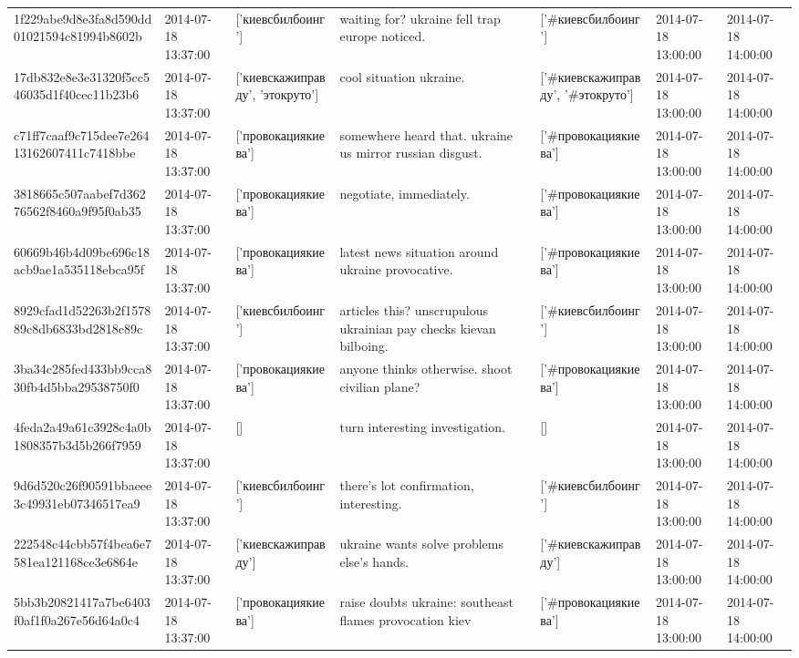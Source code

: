 \begin{tabular}{lllllll}
1f229abe9d8e3fa8d590dd01021594c81994b8602b & 2014-07-18 13:37:00 & ['киевсбилбоинг'] & waiting for? ukraine fell trap europe noticed. & ['#киевсбилбоинг'] & 2014-07-18 13:00:00 & 2014-07-18 14:00:00 \\
17db832e8e3e31320f5cc546035d1f40cec11b23b6 & 2014-07-18 13:37:00 & ['киевскажиправду', 'этокруто'] & cool situation ukraine. & ['#киевскажиправду', '#этокруто'] & 2014-07-18 13:00:00 & 2014-07-18 14:00:00 \\
c71ff7caaf9c715dee7e26413162607411c7418bbe & 2014-07-18 13:37:00 & ['провокациякиева'] & somewhere heard that. ukraine us mirror russian disgust. & ['#провокациякиева'] & 2014-07-18 13:00:00 & 2014-07-18 14:00:00 \\
3818665c507aabef7d36276562f8460a9f95f0ab35 & 2014-07-18 13:37:00 & ['провокациякиева'] & negotiate, immediately. & ['#провокациякиева'] & 2014-07-18 13:00:00 & 2014-07-18 14:00:00 \\
60669b46b4d09be696c18acb9ae1a535118ebca95f & 2014-07-18 13:37:00 & ['провокациякиева'] & latest news situation around ukraine provocative. & ['#провокациякиева'] & 2014-07-18 13:00:00 & 2014-07-18 14:00:00 \\
8929cfad1d52263b2f157889c8db6833bd2818c89c & 2014-07-18 13:37:00 & ['киевсбилбоинг'] & articles this? unscrupulous ukrainian pay checks kievan bilboing. & ['#киевсбилбоинг'] & 2014-07-18 13:00:00 & 2014-07-18 14:00:00 \\
3ba34c285fed433bb9cca830fb4d5bba29538750f0 & 2014-07-18 13:37:00 & ['провокациякиева'] & anyone thinks otherwise. shoot civilian plane? & ['#провокациякиева'] & 2014-07-18 13:00:00 & 2014-07-18 14:00:00 \\
4feda2a49a61c3928c4a0b1808357b3d5b266f7959 & 2014-07-18 13:37:00 & [] & turn interesting investigation. & [] & 2014-07-18 13:00:00 & 2014-07-18 14:00:00 \\
9d6d520c26f90591bbaeee3c49931eb07346517ea9 & 2014-07-18 13:37:00 & ['киевсбилбоинг'] & there's lot confirmation, interesting. & ['#киевсбилбоинг'] & 2014-07-18 13:00:00 & 2014-07-18 14:00:00 \\
222548c44cbb57f4bea6e7581ea121168ce3e6864e & 2014-07-18 13:37:00 & ['киевскажиправду'] & ukraine wants solve problems else's hands. & ['#киевскажиправду'] & 2014-07-18 13:00:00 & 2014-07-18 14:00:00 \\
5bb3b20821417a7be6403f0af1f0a267e56d64a0c4 & 2014-07-18 13:37:00 & ['провокациякиева'] & raise doubts ukraine: southeast flames provocation kiev & ['#провокациякиева'] & 2014-07-18 13:00:00 & 2014-07-18 14:00:00 \\

\end{tabular}
